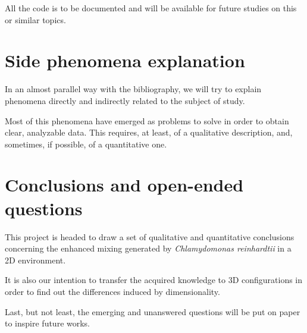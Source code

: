 All the code is to be documented and will be available for future studies on this or similar topics.

\section{Side phenomena explanation}

In an almost parallel way with the bibliography, we will try to explain phenomena directly and indirectly related to the subject of study.

Most of this phenomena have emerged as problems to solve in order to obtain clear, analyzable data. This requires, at least, of a qualitative description, and, sometimes, if possible, of a quantitative one.

\section{Conclusions and open-ended questions}

This project is headed to draw a set of qualitative and quantitative conclusions concerning the enhanced mixing generated by \textit{Chlamydomonas reinhardtii} in a 2D environment.

It is also our intention to transfer the acquired knowledge to 3D configurations in order to find out the differences induced by dimensionality.

Last, but not least, the emerging and unanswered questions will be put on paper to inspire future works.
















